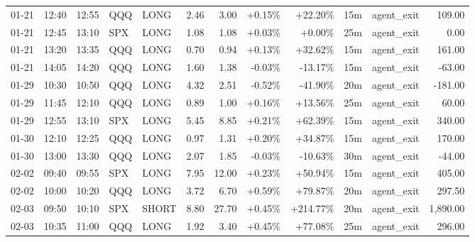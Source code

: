 \documentclass[11pt,a4paper]{article}
\begin{document}
\begin{center}
\begin{longtable}{>{\color{txtmain}}l l l l l r r r r r >{\color{txtmain}}l r}
01-21 & 12:40 & 12:55 & QQQ & LONG & 2.46 & 3.00 & \textcolor{wingreen}{+0.15\%} & \textcolor{wingreen}{+22.20\%} & 15m & agent\_exit & \textcolor{wingreen}{109.00} \\
01-21 & 12:45 & 13:10 & SPX & LONG & 1.08 & 1.08 & \textcolor{wingreen}{+0.03\%} & \textcolor{wingreen}{+0.00\%} & 25m & agent\_exit & \textcolor{wingreen}{0.00} \\
01-21 & 13:20 & 13:35 & QQQ & LONG & 0.70 & 0.94 & \textcolor{wingreen}{+0.13\%} & \textcolor{wingreen}{+32.62\%} & 15m & agent\_exit & \textcolor{wingreen}{161.00} \\
01-21 & 14:05 & 14:20 & QQQ & LONG & 1.60 & 1.38 & \textcolor{lossred}{-0.03\%} & \textcolor{lossred}{-13.17\%} & 15m & agent\_exit & \textcolor{lossred}{-63.00} \\
01-29 & 10:30 & 10:50 & QQQ & LONG & 4.32 & 2.51 & \textcolor{lossred}{-0.52\%} & \textcolor{lossred}{-41.90\%} & 20m & agent\_exit & \textcolor{lossred}{-181.00} \\
01-29 & 11:45 & 12:10 & QQQ & LONG & 0.89 & 1.00 & \textcolor{wingreen}{+0.16\%} & \textcolor{wingreen}{+13.56\%} & 25m & agent\_exit & \textcolor{wingreen}{60.00} \\
01-29 & 12:55 & 13:10 & SPX & LONG & 5.45 & 8.85 & \textcolor{wingreen}{+0.21\%} & \textcolor{wingreen}{+62.39\%} & 15m & agent\_exit & \textcolor{wingreen}{340.00} \\
01-30 & 12:10 & 12:25 & QQQ & LONG & 0.97 & 1.31 & \textcolor{wingreen}{+0.20\%} & \textcolor{wingreen}{+34.87\%} & 15m & agent\_exit & \textcolor{wingreen}{170.00} \\
01-30 & 13:00 & 13:30 & QQQ & LONG & 2.07 & 1.85 & \textcolor{lossred}{-0.03\%} & \textcolor{lossred}{-10.63\%} & 30m & agent\_exit & \textcolor{lossred}{-44.00} \\
02-02 & 09:40 & 09:55 & SPX & LONG & 7.95 & 12.00 & \textcolor{wingreen}{+0.23\%} & \textcolor{wingreen}{+50.94\%} & 15m & agent\_exit & \textcolor{wingreen}{405.00} \\
02-02 & 10:00 & 10:20 & QQQ & LONG & 3.72 & 6.70 & \textcolor{wingreen}{+0.59\%} & \textcolor{wingreen}{+79.87\%} & 20m & agent\_exit & \textcolor{wingreen}{297.50} \\
02-03 & 09:50 & 10:10 & SPX & SHORT & 8.80 & 27.70 & \textcolor{wingreen}{+0.45\%} & \textcolor{wingreen}{+214.77\%} & 20m & agent\_exit & \textcolor{wingreen}{1,890.00} \\
02-03 & 10:35 & 11:00 & QQQ & LONG & 1.92 & 3.40 & \textcolor{wingreen}{+0.45\%} & \textcolor{wingreen}{+77.08\%} & 25m & agent\_exit & \textcolor{wingreen}{296.00} \\

\end{longtable}
\end{center}
\end{document}
